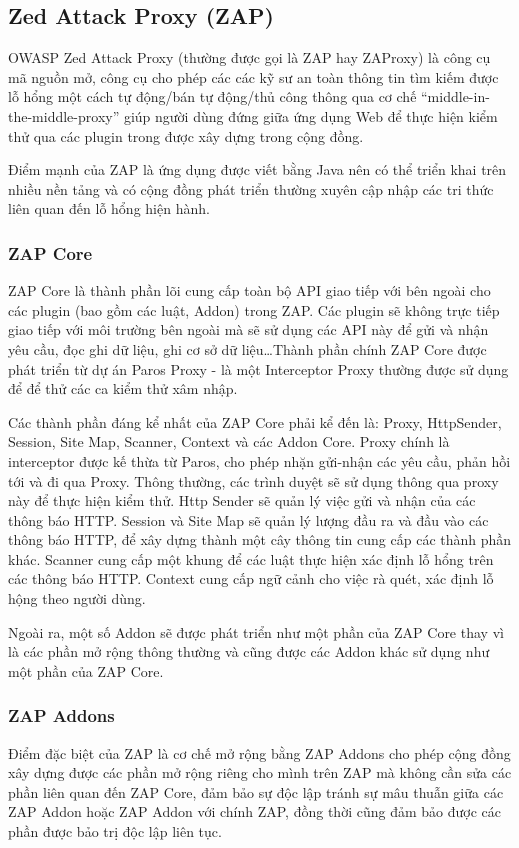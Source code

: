 \documentclass[./../main.tex]{subfiles}
\begin{document}
\subsection{Zed Attack Proxy (ZAP)}
OWASP Zed Attack Proxy (thường được gọi là  ZAP hay ZAProxy) là công cụ mã nguồn mở,
công cụ cho phép các các kỹ sư an toàn thông tin tìm kiếm được lỗ hổng một cách tự
động/bán tự động/thủ công thông qua cơ chế “middle-in-the-middle-proxy” giúp người
dùng đứng giữa ứng dụng Web để thực hiện kiểm thử qua các plugin trong được xây dựng
trong cộng đồng.

Điểm mạnh của ZAP là ứng dụng được viết bằng Java nên có thể triển khai trên
nhiều nền tảng và có cộng đồng phát triển thường xuyên cập nhập các tri thức
liên quan đến lỗ hổng hiện hành.

\subsubsection{ZAP Core}

ZAP Core là thành phần lõi cung cấp toàn bộ API giao tiếp với bên ngoài cho các
plugin (bao gồm các luật, Addon) trong ZAP. Các plugin sẽ không trực tiếp giao tiếp
với môi trường bên ngoài mà sẽ sử dụng các API này để  gửi và nhận yêu cầu, đọc ghi
dữ liệu, ghi cơ sở dữ liệu\ldots Thành phần chính ZAP Core được phát triển từ dự án
Paros Proxy - là một Interceptor Proxy thường được sử dụng để để thử các ca kiểm thử
xâm nhập.

Các thành phần đáng kể nhất của ZAP Core phải kể đến là: Proxy, HttpSender, Session,
Site Map, Scanner, Context và các Addon Core. Proxy chính là interceptor được kế thừa
từ Paros, cho phép nhặn gửi-nhận các yêu cầu, phản hồi tới và đi qua Proxy. Thông
thường, các trình duyệt sẽ sử dụng thông qua proxy này để thực hiện kiểm thử. Http
Sender sẽ quản lý việc gửi và nhận của các thông báo HTTP. Session và Site Map sẽ quản lý
lượng đầu ra và đầu vào các thông báo HTTP, để xây dựng thành một cây thông tin cung
cấp các thành phần khác. Scanner cung cấp một khung để các luật thực hiện xác định
lỗ hổng trên các thông báo HTTP. Context cung cấp ngữ cảnh cho việc rà quét, xác định
lỗ hộng theo người dùng.

Ngoài ra, một số Addon sẽ được phát triển như một phần của ZAP Core thay vì
là các phần mở rộng thông thường và cũng được các Addon khác sử dụng như
một phần của ZAP Core.

\subsubsection{ZAP Addons}
Điểm đặc biệt của ZAP là cơ chế mở rộng bằng ZAP Addons cho phép cộng đồng
xây dựng được các phần mở rộng riêng cho mình trên ZAP mà không cần sửa
các phần liên quan đến ZAP Core, đảm bảo sự độc lập tránh sự mâu thuẫn giữa
các ZAP Addon hoặc ZAP Addon với chính ZAP, đồng thời cũng đảm bảo được các
phần được bảo trị độc lập liên tục.
\end{document}
